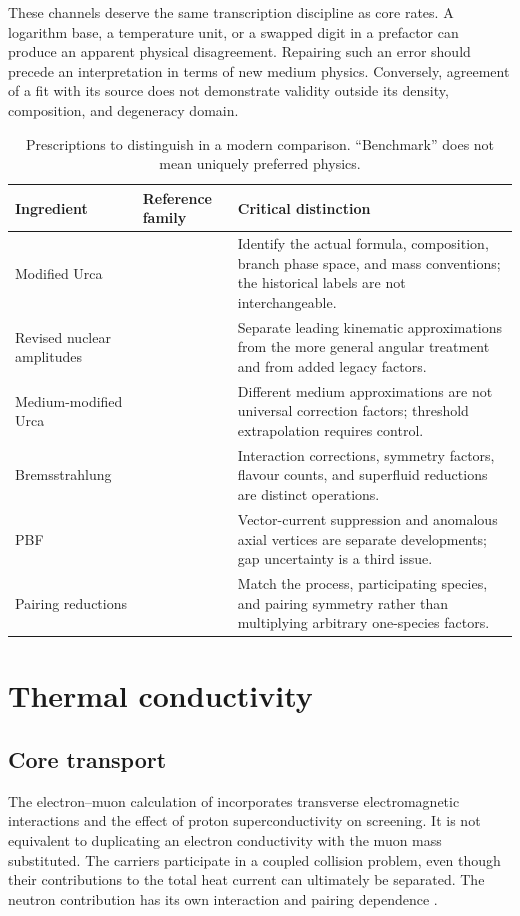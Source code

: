 \documentclass{aa}
\begin{document}
These channels deserve the same transcription discipline as core rates. A logarithm base, a temperature unit, or a swapped digit in a prefactor can produce an apparent physical disagreement. Repairing such an error should precede an interpretation in terms of new medium physics. Conversely, agreement of a fit with its source does not demonstrate validity outside its density, composition, and degeneracy domain.

\begin{table}
\caption{Prescriptions to distinguish in a modern comparison. ``Benchmark'' does not mean uniquely preferred physics.}
\label{tab:rates}
\centering\small
\begin{tabularx}{\textwidth}{p{2.4cm}p{3.7cm}X}
\toprule
Ingredient & Reference family & Critical distinction \\
\midrule
Modified Urca & \citet{Friman1979,Yakovlev1995,Yakovlev2001} & Identify the actual formula, composition, branch phase space, and mass conventions; the historical labels are not interchangeable.\\
Revised nuclear amplitudes & \citet{Bottaro2024} & Separate leading kinematic approximations from the more general angular treatment and from added legacy factors.\\
Medium-modified Urca & \citet{Shternin2018,Blaschke2004} & Different medium approximations are not universal correction factors; threshold extrapolation requires control.\\
Bremsstrahlung & \citet{Schwenk2004,Bottaro2024} & Interaction corrections, symmetry factors, flavour counts, and superfluid reductions are distinct operations.\\
PBF & \citet{Leinson2006,Page2009,Leinson2010} & Vector-current suppression and anomalous axial vertices are separate developments; gap uncertainty is a third issue.\\
Pairing reductions & \citet{Yakovlev1999,Gusakov2002} & Match the process, participating species, and pairing symmetry rather than multiplying arbitrary one-species factors.\\
\bottomrule
\end{tabularx}
\end{table}

\section{Thermal conductivity}
\subsection{Core transport}
The electron--muon calculation of \citet{Shternin2007} incorporates transverse electromagnetic interactions and the effect of proton superconductivity on screening. It is not equivalent to duplicating an electron conductivity with the muon mass substituted. The carriers participate in a coupled collision problem, even though their contributions to the total heat current can ultimately be separated. The neutron contribution has its own interaction and pairing dependence \citep{Baiko2001}.
\end{document}
